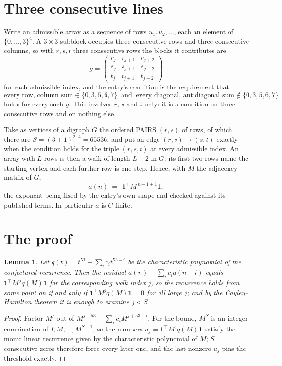 \documentclass[11pt,a4paper]{article}
\theoremstyle{plain}
\newtheorem{lemma}[theorem]{Lemma}
\theoremstyle{definition}
\begin{document}
\section{Three consecutive lines}

Write an admissible array as a sequence of rows $u_1,u_2,\dots$, each an element of
$\{0,\dots,3\}^{4}$. A $3\times3$ subblock occupies three consecutive rows and
three consecutive columns, so with $r,s,t$ three consecutive rows the blocks it
contributes are
\[
g=\begin{pmatrix}r_j&r_{j+1}&r_{j+2}\\ s_j&s_{j+1}&s_{j+2}\\ t_j&t_{j+1}&t_{j+2}\end{pmatrix}
\]
for each admissible index, and the entry's condition is the requirement that
\[
\text{every row, column sum} \in \{0,3,5,6,7\}\ \text{ and }\ \text{every diagonal, antidiagonal sum} \notin \{0,3,5,6,7\}
\]
holds for every such $g$. This involves $r$, $s$ and $t$ only: it is a condition on
three consecutive rows and on nothing else.

Take as vertices of a digraph $G$ the ordered PAIRS $(r,s)$ of rows, of which there are
$S=(3+1)^{2\cdot4}=65536$, and put an edge $(r,s)\to(s,t)$ exactly when the condition
holds for the triple $(r,s,t)$ at every admissible index. An array with $L$ rows is then a
walk of length $L-2$ in $G$: its first two rows name the starting vertex and each further
row is one step. Hence, with $M$ the adjacency matrix of $G$,
\[
a(n)\;=\;\,\mathbf{1}^{\!\top}M^{\,n-1+1}\mathbf{1},
\]
the exponent being fixed by the entry's own shape and checked against its published terms.
In particular $a$ is $C$-finite.

\section{The proof}

\begin{lemma}\label{lem:crit}
Let $q(t)=t^{53}-\sum_i c_it^{53-i}$ be the characteristic polynomial of the
conjectured recurrence. Then the residual $a(n)-\sum_ic_ia(n-i)$ equals
$\mathbf{1}^{\!\top}M^{\,j}q(M)\mathbf{1}$ for the corresponding walk index
$j$, so the recurrence holds from some point on if and only if
$\mathbf{1}^{\!\top}M^{j}q(M)\mathbf{1}=0$ for all large $j$; and by the
Cayley--Hamilton theorem it is enough to examine $j<S$.
\end{lemma}

\begin{proof}
Factor $M^{j}$ out of $M^{j+53}-\sum_ic_iM^{j+53-i}$. For the bound, $M^{S}$
is an integer combination of $I,M,\dots,M^{S-1}$, so the numbers
$u_j=\mathbf{1}^{\!\top}M^{j}q(M)\mathbf{1}$ satisfy the monic linear recurrence given by
the characteristic polynomial of $M$; $S$ consecutive zeros therefore force every later one,
and the last nonzero $u_j$ pins the threshold exactly.
\end{proof}
\end{document}

